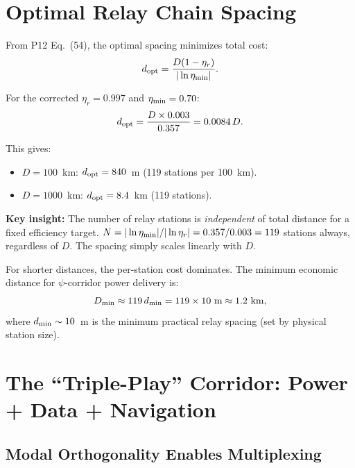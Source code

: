 \documentclass[aps,prd,twocolumn,superscriptaddress]{revtex4-2}
\begin{document}
\section{Optimal Relay Chain Spacing}
\label{sec:relay-optimization}

From P12 Eq.~(54), the optimal spacing minimizes total cost:
\begin{equation}
d_{\rm opt} = \frac{D(1-\eta_r)}{|\ln\eta_{\rm min}|}.
\end{equation}

For the corrected $\eta_r = 0.997$ and $\eta_{\rm min} = 0.70$:
\begin{equation}
d_{\rm opt} = \frac{D \times 0.003}{0.357} = 0.0084\,D.
\end{equation}

This gives:
\begin{itemize}
\item $D = 100$~km: $d_{\rm opt} = 840$~m (119 stations per 100~km).
\item $D = 1000$~km: $d_{\rm opt} = 8.4$~km (119 stations).
\end{itemize}

\textbf{Key insight:} The number of relay stations is \emph{independent}
of total distance for a fixed efficiency target.  $N = |\ln\eta_{\rm min}|/
|\ln\eta_r| = 0.357/0.003 = 119$ stations always, regardless of $D$.
The spacing simply scales linearly with $D$.

For shorter distances, the per-station cost dominates.  The minimum
economic distance for $\psi$-corridor power delivery is:
\begin{equation}
D_{\rm min} \approx 119\,d_{\rm min} = 119\times 10~\text{m}
\approx 1.2~\text{km},
\end{equation}
where $d_{\rm min} \sim 10$~m is the minimum practical relay spacing
(set by physical station size).

\section{The ``Triple-Play'' Corridor: Power + Data + Navigation}
\label{sec:triple-play}

\subsection{Modal Orthogonality Enables Multiplexing}
\end{document}
